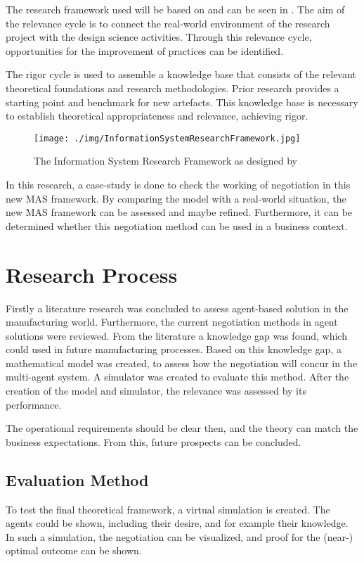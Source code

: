 The research framework used will be based on \citep{hevner2010design} and can be seen in . The aim of the relevance cycle is to connect the real-world environment of the research project with the design science activities. Through this relevance cycle, opportunities for the improvement of practices can be identified.

The rigor cycle is used to assemble a knowledge base that consists of the relevant theoretical foundations and research methodologies. Prior research provides a starting point and benchmark for new artefacts. This knowledge base is necessary to establish theoretical appropriateness and relevance, achieving rigor.

\begin{figure}[h]
	\centering
	\texttt{[image: ./img/InformationSystemResearchFramework.jpg]}
	\caption{The Information System Research Framework as designed by \citet{hevner2010design}}
	\label{fig:InformationSystemResearchFramework}
\end{figure}

In this research, a case-study is done to check the working of negotiation in this new MAS framework. By comparing the model with a real-world situation, the new MAS framework can be assessed and maybe refined. Furthermore, it can be determined whether this negotiation method can be used in a business context.

\section{Research Process}
Firstly a literature research was concluded to assess agent-based solution in the manufacturing world. Furthermore, the current negotiation methods in agent solutions were reviewed. From the literature a knowledge gap was found, which could used in future manufacturing processes. Based on this knowledge gap, a mathematical model was created, to assess how the negotiation will concur in the multi-agent system. A simulator was created to evaluate this method. After the creation of the model and simulator, the relevance was assessed by its performance.

The operational requirements  should be clear then, and the theory can match the business expectations. From this, future prospects can be concluded.

\subsection{Evaluation Method}
To test the final theoretical framework, a virtual simulation is created. The agents could be shown, including their desire, and for example their knowledge. In such a simulation, the negotiation can be visualized, and proof for the (near-) optimal outcome can be shown. 

